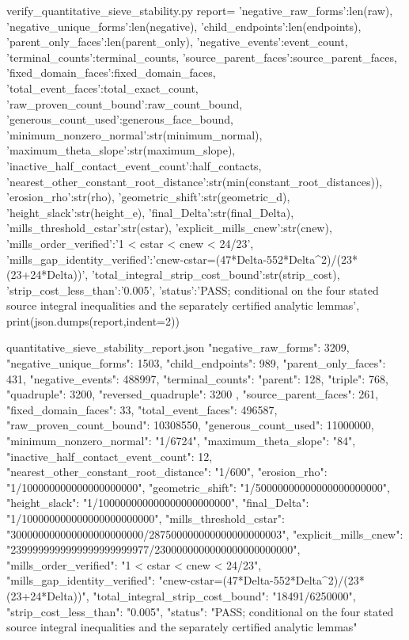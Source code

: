 \begin{filecontents*}[overwrite]{verify_quantitative_sieve_stability.py}
report={
 'negative_raw_forms':len(raw),
 'negative_unique_forms':len(negative),
 'child_endpoints':len(endpoints),
 'parent_only_faces':len(parent_only),
 'negative_events':event_count,
 'terminal_counts':terminal_counts,
 'source_parent_faces':source_parent_faces,
 'fixed_domain_faces':fixed_domain_faces,
 'total_event_faces':total_exact_count,
 'raw_proven_count_bound':raw_count_bound,
 'generous_count_used':generous_face_bound,
 'minimum_nonzero_normal':str(minimum_normal),
 'maximum_theta_slope':str(maximum_slope),
 'inactive_half_contact_event_count':half_contacts,
 'nearest_other_constant_root_distance':str(min(constant_root_distances)),
 'erosion_rho':str(rho),
 'geometric_shift':str(geometric_d),
 'height_slack':str(height_e),
 'final_Delta':str(final_Delta),
 'mills_threshold_cstar':str(cstar),
 'explicit_mills_cnew':str(cnew),
 'mills_order_verified':'1 < cstar < cnew < 24/23',
 'mills_gap_identity_verified':'cnew-cstar=(47*Delta-552*Delta^2)/(23*(23+24*Delta))',
 'total_integral_strip_cost_bound':str(strip_cost),
 'strip_cost_less_than':'0.005',
 'status':'PASS; conditional on the four stated source integral inequalities and the separately certified analytic lemmas',
}
print(json.dumps(report,indent=2))
\end{filecontents*}
\begin{filecontents*}[overwrite]{quantitative_sieve_stability_report.json}
{
  "negative_raw_forms": 3209,
  "negative_unique_forms": 1503,
  "child_endpoints": 989,
  "parent_only_faces": 431,
  "negative_events": 488997,
  "terminal_counts": {
    "parent": 128,
    "triple": 768,
    "quadruple": 3200,
    "reversed_quadruple": 3200
  },
  "source_parent_faces": 261,
  "fixed_domain_faces": 33,
  "total_event_faces": 496587,
  "raw_proven_count_bound": 10308550,
  "generous_count_used": 11000000,
  "minimum_nonzero_normal": "1/6724",
  "maximum_theta_slope": "84",
  "inactive_half_contact_event_count": 12,
  "nearest_other_constant_root_distance": "1/600",
  "erosion_rho": "1/100000000000000000000",
  "geometric_shift": "1/50000000000000000000000",
  "height_slack": "1/100000000000000000000000",
  "final_Delta": "1/100000000000000000000000",
  "mills_threshold_cstar": "300000000000000000000000/287500000000000000000003",
  "explicit_mills_cnew": "2399999999999999999999977/2300000000000000000000000",
  "mills_order_verified": "1 < cstar < cnew < 24/23",
  "mills_gap_identity_verified": "cnew-cstar=(47*Delta-552*Delta^2)/(23*(23+24*Delta))",
  "total_integral_strip_cost_bound": "18491/6250000",
  "strip_cost_less_than": "0.005",
  "status": "PASS; conditional on the four stated source integral inequalities and the separately certified analytic lemmas"
}
\end{filecontents*}
